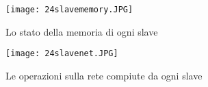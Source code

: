 \begin{figure}
  \begin{center}
    \texttt{[image: 24slavememory.JPG]}
    \caption{Lo stato della memoria di ogni slave}
    \label{fig:8slavememory.JPG}
  \end{center}
\end{figure}

\begin{figure}
  \begin{center}
    \texttt{[image: 24slavenet.JPG]}
    \caption{Le operazioni sulla rete compiute da ogni slave}
    \label{fig:8slavenet.JPG}
  \end{center}
\end{figure}